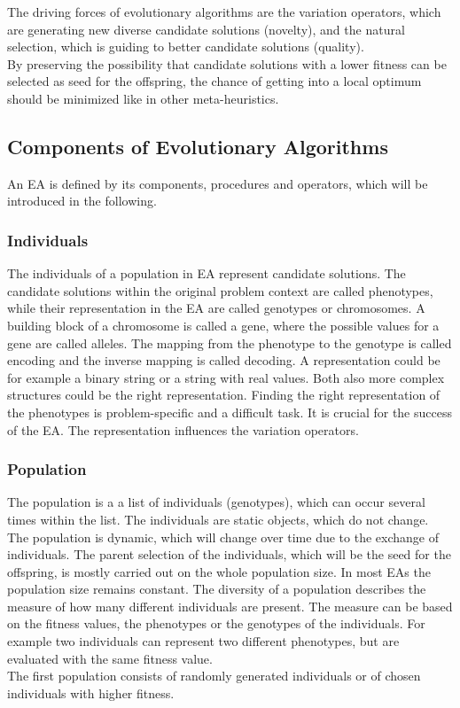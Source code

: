 The driving forces of evolutionary algorithms are the variation operators, which are generating new diverse candidate solutions (novelty), and the natural selection, which is guiding to better candidate solutions (quality)\cite{Eiben}.\\
By preserving the possibility that candidate solutions with a lower fitness can be selected as seed for the offspring, the chance of getting into a local optimum should be minimized like in other meta-heuristics.\\

    \subsection{Components of Evolutionary Algorithms}
    \label{sec:EAcomponents}
    An EA is defined by its components, procedures and operators, which will be introduced in the following.
        
        \subsubsection{Individuals}
        The individuals of a population in EA represent candidate solutions. The candidate solutions within the original problem context are called phenotypes, while their representation in the EA are called genotypes or chromosomes. A building block of a chromosome is called a gene, where the possible values for a gene are called alleles. The mapping from the phenotype to the genotype is called encoding and the inverse mapping is called decoding. A representation could be for example a binary string or a string with real values. Both also more complex structures could be the right representation. Finding the right representation of the phenotypes is problem-specific and a difficult task. It is crucial for the success of the EA. The representation influences the variation operators.
        
        \subsubsection{Population}
        The population is a a list of individuals (genotypes), which can occur several times within the list. The individuals are static objects, which do not change. The population is dynamic, which will change over time due to the exchange of individuals. The parent selection of the individuals, which will be the seed for the offspring, is mostly carried out on the whole population size. In most EAs the population size remains constant. The diversity of a population describes the measure of how many different individuals are present. The measure can be based on the fitness values, the phenotypes or the genotypes of the individuals. For example two individuals can represent two different phenotypes, but are evaluated with the same fitness value.\\
        The first population consists of randomly generated individuals or of chosen individuals with higher fitness.
        
